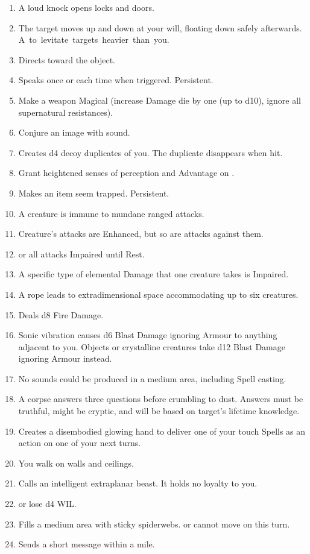 \documentclass[itdr]{subfiles}
\begin{document}
\begin{enumerate}
	\item {} A loud knock opens locks and doors.
	\item {} The target moves up and down at your will, floating down safely afterwards. \mbox{A  to levitate targets heavier than you.}
	\item {} Directs toward the object.
	\item {} Speaks once or each time when triggered. Persistent.
	\item {} Make a weapon Magical (increase Damage die by one (up to d10), ignore all supernatural resistances).
	\item {} Conjure an image with sound.
	\item {} Creates d4 decoy duplicates of you. The duplicate disappears when hit.
	\item {} Grant heightened senses of perception and Advantage on .
	\item {} Makes an item seem trapped. Persistent.
	\item {} A creature is immune to mundane ranged attacks.
	\item {} Creature's attacks are Enhanced, but so are attacks against them.
	\item {}  or all attacks Impaired until Rest.
	\item {} A specific type of elemental Damage that one creature takes is Impaired.
	\item {} A rope leads to extradimensional space accommodating up to six creatures.
	\item {} Deals d8 Fire Damage.
	\item {} Sonic vibration causes d6 Blast Damage ignoring Armour to anything adjacent to you. Objects or crystalline creatures take d12 Blast Damage ignoring Armour instead.
	\item {} No sounds could be produced in a medium area, including Spell casting.
	\item {} A corpse answers three questions before crumbling to dust. Answers must be truthful, might be cryptic, and will be based on target's lifetime knowledge.
	\item {} Creates a disembodied glowing hand to deliver one of your touch Spells as an action on one of your next turns.
	\item {} You walk on walls and ceilings.
	\item {} Calls an intelligent extraplanar beast. It holds no loyalty to you.
	\item {}  or lose d4 WIL.
	\item {} Fills a medium area with sticky spiderwebs.  or cannot move on this turn.
	\item {} Sends a short message within a mile.
\end{enumerate}
\end{document}
